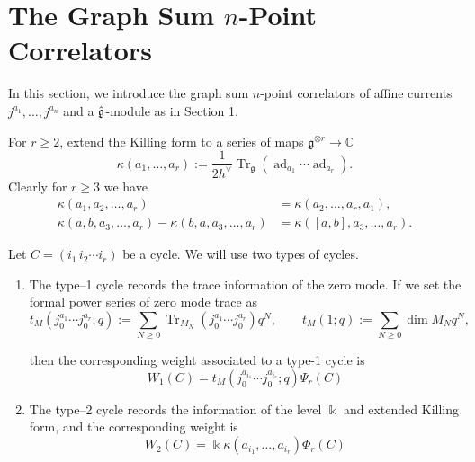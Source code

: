 \documentclass[11pt,a4paper]{amsart}
\numberwithin{equation}{section}
\theoremstyle{definition}
\theoremstyle{remark}
\DeclareMathOperator{\Tr}{Tr}
\DeclareMathOperator{\ad}{ad}
\newcommand{\CC}{\mathbb C}
\newcommand{\g}{\mathfrak g}
\newcommand{\kk}{\Bbbk}
\begin{document}
\section{The Graph Sum $n$-Point Correlators}
\label{sec:graph-sum}

In this section, we introduce the graph sum $n$-point correlators of affine currents $j^{a_1} , \dots , j^{a_n}$ and a $\hat {\frak g}$-module as in Section 1.

For $r\geq2$, extend the Killing form to a series of maps $\mathfrak{g}^{\otimes r}\to \CC$
\begin{equation}
 \kappa(a_1,\ldots,a_r):=\frac1{2h^\vee}
 \Tr_{\g}(\ad_{a_1}\cdots\ad_{a_r}).
 \label{eq:extended-form}
\end{equation}
Clearly for $r\geq 3$ we have 
\begin{align}
 \kappa(a_1,a_2,\ldots,a_r)&=\kappa(a_2,\ldots,a_r,a_1),
 \label{eq:extended-cyclic}\\
 \kappa(a,b,a_3,\ldots,a_r)-\kappa(b,a,a_3,\ldots,a_r)
 &=\kappa([a,b],a_3,\ldots,a_r).
 \label{eq:extended-commutator}
\end{align}



 Let $C=(i_1\,i_2\cdots i_r)$ be a cycle.  We will use two types of cycles.

\begin{enumerate}
\item
The type--1 cycle records the trace information of the zero mode. If we set the formal power series of zero mode trace as
\begin{equation}
 t_M(j_0^{a_1}\cdots j_0^{a_r};q):=
 \sum_{N\geq0}\Tr_{M_{ N}}
 (j_0^{a_1}\cdots j_0^{a_r})q^N,
 \qquad t_M(1;q):=\sum_{N\geq0}\dim M_{N}q^N,
 \label{eq:zero-mode-series-early}
\end{equation}

then the corresponding weight associated to a type-1 cycle is
\[
W_1(C)=
t_M(j_0^{a_{i_1}}\cdots j_0^{a_{i_r}};q) \Psi_r(C)
\]
\item
The type--2 cycle records the information of the level $\kk$ and extended Killing form, and the corresponding weight is
\[
W_2(C)=
\kk\kappa(a_{i_1},\ldots,a_{i_r})\Phi_r(C)
\]
\end{enumerate}
\end{document}
